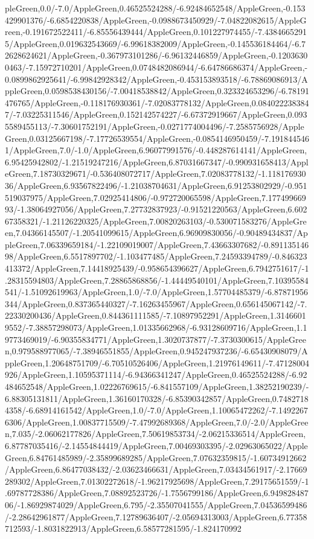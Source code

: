 {\begin{tikzternal}
pleGreen,0.0/-7.0/AppleGreen,0.46525524288/-6.92484652548/AppleGreen,-0.153429901376/-6.6854220838/AppleGreen,-0.0988673450929/-7.04822082615/AppleGreen,-0.191672522411/-6.85556439444/AppleGreen,0.101227974455/-7.43846652915/AppleGreen,0.019632543669/-6.99618382009/AppleGreen,-0.145536184464/-6.72628624621/AppleGreen,-0.367973101286/-6.96132446859/AppleGreen,-0.12036300463/-7.15972710201/AppleGreen,0.0748482086944/-6.64786686374/AppleGreen,-0.0899862925641/-6.99842928342/AppleGreen,-0.453153893518/-6.78869086913/AppleGreen,0.0598538430156/-7.00418538842/AppleGreen,0.323324653296/-6.78191476765/AppleGreen,-0.118176930361/-7.02083778132/AppleGreen,0.0840222383847/-7.03225311546/AppleGreen,0.152142574227/-6.67372919667/AppleGreen,0.0935589455113/-7.30601752191/AppleGreen,-0.0271774004496/-7.2585756928/AppleGreen,0.03125667198/-7.17726539554/AppleGreen,-0.0854146950459/-7.1918445461/AppleGreen,7.0/-1.0/AppleGreen,6.96077991576/-0.448287614141/AppleGreen,6.95425942802/-1.21519247216/AppleGreen,6.87031667347/-0.990931658413/AppleGreen,7.18730329671/-0.536408072717/AppleGreen,7.02083778132/-1.11817693036/AppleGreen,6.93567822496/-1.21038704631/AppleGreen,6.91253802929/-0.951519037975/AppleGreen,7.02925414806/-0.972720065598/AppleGreen,7.17749966993/-1.38064927056/AppleGreen,7.27732837923/-0.91521220563/AppleGreen,6.60267358321/-1.21126220325/AppleGreen,7.00820263103/-0.530071583276/AppleGreen,7.04366145507/-1.20541099615/AppleGreen,6.96909830056/-0.90489434837/AppleGreen,7.06339659184/-1.22109019007/AppleGreen,7.43663307682/-0.89113514698/AppleGreen,6.5517897702/-1.103477485/AppleGreen,7.24593394789/-0.846323413372/AppleGreen,7.14418925439/-0.958654396627/AppleGreen,6.7942751617/-1.28315594803/AppleGreen,7.28865868856/-1.44449540101/AppleGreen,7.10395584541/-1.51092619963/AppleGreen,1.0/-7.0/AppleGreen,1.57704485379/-6.87871956344/AppleGreen,0.837365440327/-7.16263455967/AppleGreen,0.656145067142/-7.22330200436/AppleGreen,0.844361111585/-7.10897952291/AppleGreen,1.31466019552/-7.38857298073/AppleGreen,1.01335662968/-6.93128609716/AppleGreen,1.19773469019/-6.90355834771/AppleGreen,1.3020737877/-7.3730300615/AppleGreen,0.979588977065/-7.38946551855/AppleGreen,0.945247937236/-6.65430908079/AppleGreen,1.20648751709/-6.70510526406/AppleGreen,1.21976149611/-7.47128004926/AppleGreen,1.10595371114/-6.94366341247/AppleGreen,0.46525524288/-6.92484652548/AppleGreen,1.02226769615/-6.841557109/AppleGreen,1.38252190239/-6.88305131811/AppleGreen,1.36160170328/-6.85390342857/AppleGreen,0.74827184358/-6.68914161542/AppleGreen,1.0/-7.0/AppleGreen,1.10065472262/-7.14922676306/AppleGreen,1.00837715509/-7.47992689368/AppleGreen,7.0/-2.0/AppleGreen,7.035/-2.06062177826/AppleGreen,7.50619853734/-2.06215336514/AppleGreen,6.87787035416/-2.14554844419/AppleGreen,7.00469303395/-2.02963065022/AppleGreen,6.84761485989/-2.35899689285/AppleGreen,7.07632359815/-1.60734912662/AppleGreen,6.86477038432/-2.03623466631/AppleGreen,7.03434561917/-2.17669289302/AppleGreen,7.01302272618/-1.96217925698/AppleGreen,7.29175651559/-1.69787728386/AppleGreen,7.08892523726/-1.7556799186/AppleGreen,6.94982848706/-1.86929874029/AppleGreen,6.795/-2.35507041555/AppleGreen,7.04536599486/-2.28642961877/AppleGreen,7.12789636407/-2.05694313003/AppleGreen,6.77358712593/-1.8031822913/AppleGreen,6.58577281595/-1.824170992
\end{tikzternal}}
